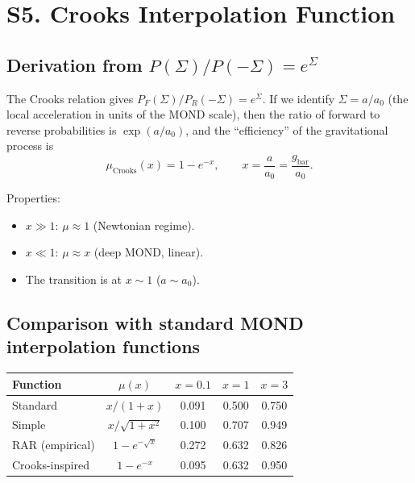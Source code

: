 \documentclass[aps,prd,preprint,superscriptaddress,longbibliography]{revtex4-2}
\newcommand{\azero}{a_0}
\begin{document}
\section{S5. Crooks Interpolation Function}
\label{sec:interpolation}

\subsection{Derivation from $P(\Sigma)/P(-\Sigma) = e^{\Sigma}$}

The Crooks relation gives $P_F(\Sigma)/P_R(-\Sigma) = e^{\Sigma}$.
If we identify $\Sigma = a/\azero$ (the local acceleration in units
of the MOND scale), then the ratio of forward to reverse
probabilities is $\exp(a/\azero)$, and the ``efficiency'' of the
gravitational process is
\begin{equation}
\mu_{\mathrm{Crooks}}(x) = 1 - e^{-x},
\qquad x = \frac{a}{\azero} = \frac{g_{\mathrm{bar}}}{\azero}.
\label{eq:mu_Crooks}
\end{equation}

Properties:
\begin{itemize}
\item $x \gg 1$: $\mu \approx 1$ (Newtonian regime).
\item $x \ll 1$: $\mu \approx x$ (deep MOND, linear).
\item The transition is at $x\sim 1$ ($a\sim\azero$).
\end{itemize}

\subsection{Comparison with standard MOND interpolation functions}

\begin{center}
\begin{tabular}{lcccc}
\toprule
Function & $\mu(x)$ & $x=0.1$ & $x=1$ & $x=3$ \\
\midrule
Standard & $x/(1+x)$ & 0.091 & 0.500 & 0.750 \\
Simple & $x/\sqrt{1+x^2}$ & 0.100 & 0.707 & 0.949 \\
RAR (empirical) & $1-e^{-\sqrt{x}}$ & 0.272 & 0.632 & 0.826 \\
Crooks-inspired & $1-e^{-x}$ & 0.095 & 0.632 & 0.950 \\
\bottomrule
\end{tabular}
\end{center}
\end{document}
